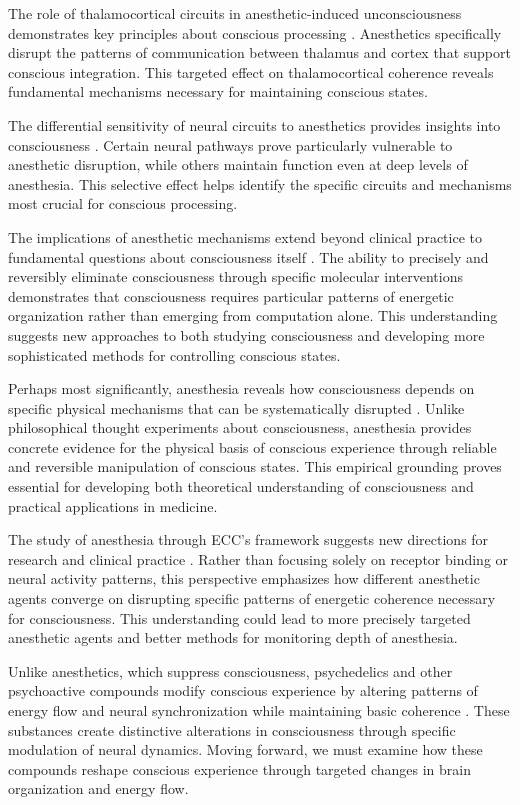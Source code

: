\begin{refsection}
The role of thalamocortical circuits in anesthetic-induced unconsciousness demonstrates key principles about conscious processing \cite{Mashour2017}. Anesthetics specifically disrupt the patterns of communication between thalamus and cortex that support conscious integration. This targeted effect on thalamocortical coherence reveals fundamental mechanisms necessary for maintaining conscious states.

The differential sensitivity of neural circuits to anesthetics provides insights into consciousness \cite{Tonner2017}. Certain neural pathways prove particularly vulnerable to anesthetic disruption, while others maintain function even at deep levels of anesthesia. This selective effect helps identify the specific circuits and mechanisms most crucial for conscious processing.

The implications of anesthetic mechanisms extend beyond clinical practice to fundamental questions about consciousness itself \cite{Alkire2008}. The ability to precisely and reversibly eliminate consciousness through specific molecular interventions demonstrates that consciousness requires particular patterns of energetic organization rather than emerging from computation alone. This understanding suggests new approaches to both studying consciousness and developing more sophisticated methods for controlling conscious states.

Perhaps most significantly, anesthesia reveals how consciousness depends on specific physical mechanisms that can be systematically disrupted \cite{Brown2010}. Unlike philosophical thought experiments about consciousness, anesthesia provides concrete evidence for the physical basis of conscious experience through reliable and reversible manipulation of conscious states. This empirical grounding proves essential for developing both theoretical understanding of consciousness and practical applications in medicine.

The study of anesthesia through ECC's framework suggests new directions for research and clinical practice \cite{Franks2008}. Rather than focusing solely on receptor binding or neural activity patterns, this perspective emphasizes how different anesthetic agents converge on disrupting specific patterns of energetic coherence necessary for consciousness. This understanding could lead to more precisely targeted anesthetic agents and better methods for monitoring depth of anesthesia.

Unlike anesthetics, which suppress consciousness, psychedelics and other psychoactive compounds modify conscious experience by altering patterns of energy flow and neural synchronization while maintaining basic coherence \cite{John2005}. These substances create distinctive alterations in consciousness through specific modulation of neural dynamics. Moving forward, we must examine how these compounds reshape conscious experience through targeted changes in brain organization and energy flow.


\end{refsection}
